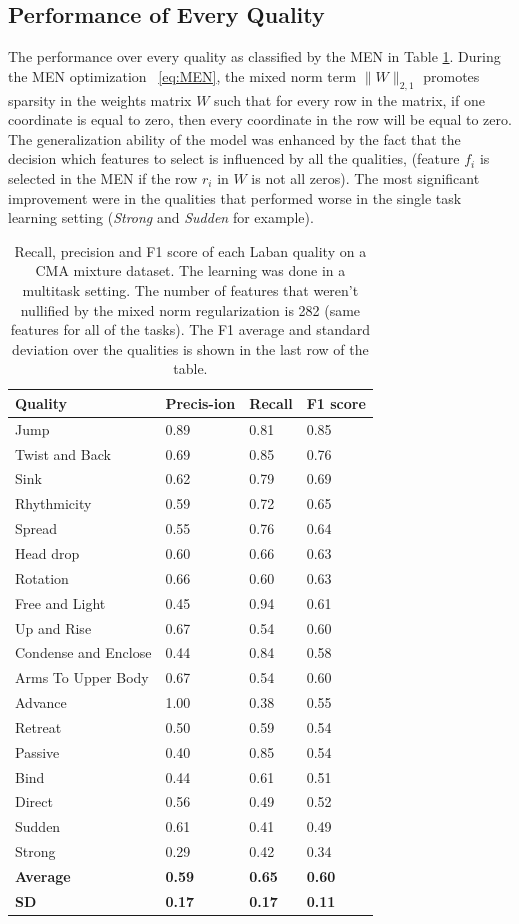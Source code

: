 \documentclass[11pt,twocolumn,varwidth=true,a4paper,fleqn]{article}
\begin{document}
\subsection{Performance of Every Quality}
The performance over every quality as classified by the MEN in Table
\ref{mixedSummary}. During the MEN optimization ~\eqref{eq:MEN}, the mixed norm
term $\|W\|_{2,1}$  promotes sparsity in the weights matrix $W$ such that for
every row in the matrix, if one coordinate is equal to zero, then every coordinate
in the row will be equal to zero.
\\The generalization ability of the model was enhanced by the fact that the
decision which features to select is influenced by all the qualities, (feature $f_i$ is
selected in the MEN if the row $r_i$ in $W$ is not all zeros). The most
significant improvement were in the qualities that performed worse in the
single task learning setting (\textit{Strong} and \textit{Sudden} for example).
\begin{table}[!h]
\centering
\begin{tabular}{|p{3cm}|p{0.9cm}|p{0.9cm}|p{0.9cm}|}
\hline
Quality&Precis-ion&Recall&F1 score\\\hline
Jump&0.89&0.81&0.85\\\hline
Twist and Back&0.69&0.85&0.76\\\hline
Sink&0.62&0.79&0.69\\\hline
Rhythmicity&0.59&0.72&0.65\\\hline
Spread&0.55&0.76&0.64\\\hline
Head drop&0.60&0.66&0.63\\\hline
Rotation&0.66&0.60&0.63\\\hline
Free and Light&0.45&0.94&0.61\\\hline
Up and Rise&0.67&0.54&0.60\\\hline
Condense and Enclose&0.44&0.84&0.58\\\hline
Arms To Upper Body&0.67&0.54&0.60\\\hline
Advance&1.00&0.38&0.55\\\hline
Retreat&0.50&0.59&0.54\\\hline
Passive&0.40&0.85&0.54\\\hline
Bind&0.44&0.61&0.51\\\hline
Direct&0.56&0.49&0.52\\\hline
Sudden&0.61&0.41&0.49\\\hline
Strong&0.29&0.42&0.34\\\hline
\textbf{Average}&\textbf{0.59}&\textbf{0.65}&\textbf{0.60}\\\hline
\textbf{SD}&\textbf{0.17}&\textbf{0.17}&\textbf{0.11}\\\hline
\end{tabular}
\caption{Recall, precision and F1 score of each Laban quality on a CMA
mixture dataset. The learning was done in a multitask setting. The number of
features that weren't nullified by the mixed norm regularization is
282 (same features for all of the tasks). The F1 average and standard
deviation over the qualities is shown in the last row of the table.}
\label{mixedSummary}
\end{table}
\end{document}
